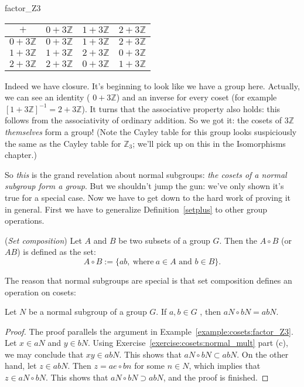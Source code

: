 {\begin{example}{factor_Z3}
\begin{center}
\begin{tabular}{c|ccc}
$+$             & $0 + 3{\mathbb Z}$ & $1 + 3{\mathbb Z}$ & $2 + 3{\mathbb Z}$ \\\hline
$0 + 3{\mathbb Z}$ & $0 + 3{\mathbb Z}$ & $1 + 3{\mathbb Z}$ & $2 + 3{\mathbb Z}$ \\
$1 + 3{\mathbb Z}$ & $1 + 3{\mathbb Z}$ & $2 + 3{\mathbb Z}$ & $0 + 3{\mathbb Z}$ \\
$2 + 3{\mathbb Z}$ & $2 + 3{\mathbb Z}$ & $0 + 3{\mathbb Z}$ & $1 + 3{\mathbb Z}$
\end{tabular}
\end{center}

Indeed we have closure.  It's beginning to look like we have a group here. Actually,  we can see an identity ( $0 + 3 {\mathbb Z}$) and an inverse for every coset (for example $[1 + 3 {\mathbb Z}]^{-1}=2 + 3 {\mathbb Z}$). It turns that the associative property also holds: this follows from the associativity of ordinary addition. So we got it: the cosets of $3 {\mathbb Z}$ \emph{themselves} form a group!  (Note the Cayley table for this group looks suspiciously the same as the Cayley table for ${\mathbb Z}_3$; we'll pick up on this in the Isomorphisms chapter.)  
\end{example}

 So \emph{this} is the grand revelation about normal subgroups: \emph{the cosets of a normal subgroup form a group}. But we shouldn't jump the gun: we've only shown it's true for a special case. Now we have to get down to the hard work of proving it in general. First we have to generalize Definition~\ref{setplus} to other group operations.

\begin{defn}\label{setcomp}(\emph{Set composition})  Let $A$ and $B$ be two subsets of a group $G$.  Then the  $A \circ B$ (or $AB$)  is defined as the set:
\[ A \circ B := \{a b, \mathrm{~where~} a \in A \text{ and } b \in B\} .\]
\end{defn}

The reason that normal subgroups are special is that set composition defines an operation on cosets:

\begin{thm}\label{norm_comp}
Let $N$ be a normal subgroup of a group $G$. If $a,b \in G$ , then $aN \circ bN = abN$.
\end{thm}
\begin{proof}
The proof parallels the argument in Example~\ref{example:cosets:factor_Z3}. Let $x \in aN$ and $y \in bN$. 
Using Exercise~\ref{exercise:cosets:normal_mult} part (c), we may conclude that $xy \in abN$.  This shows that $aN \circ bN \subset abN$.  On the other hand,
let $z \in abN$.  Then $z = ae \circ b  n$ for some $n\in N$, which implies that $z \in aN \circ bN$.  This shows that $aN \circ bN \supset abN$, and the proof is finished.
\end{proof}

}
